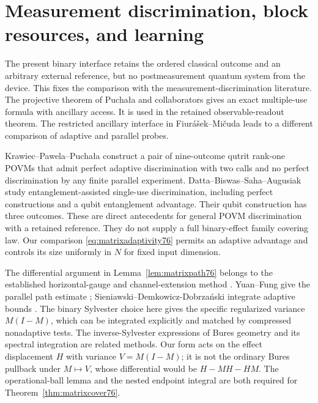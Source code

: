 \section{Measurement discrimination, block resources, and learning}
\label{sec:matrixcomparison76}
\label{sec:blockcomparison78}
\label{sec:confidencecomparison80}
The present binary interface retains the ordered classical outcome
and an arbitrary external reference, but no postmeasurement quantum
system from the device. This fixes the comparison with the
measurement-discrimination literature. The projective theorem of
Pucha\l a and collaborators \cite[Corollary~1 and Theorem~2]{PPKKO72}
gives an exact multiple-use formula with ancillary access. It is
used in the retained observable-readout theorem. The restricted
ancillary interface in Fiur\'a\v sek--Mi\v cuda \cite{FM75} leads
to a different comparison of adaptive and parallel probes.

Krawiec--Pawela--Pucha\l a \cite[Section~4]{KPP76} construct a pair
of nine-outcome qutrit rank-one POVMs that admit perfect adaptive
discrimination with two calls and no perfect discrimination by
any finite parallel experiment. Datta--Biswas--Saha--Augusiak
\cite[Theorems~3--5]{DBSA76} study entanglement-assisted
single-use discrimination, including perfect constructions and a
qubit entanglement advantage. Their qubit construction has three
outcomes. These are direct antecedents for general POVM
discrimination with a retained reference. They do not supply a
full binary-effect family covering law. Our comparison
\eqref{eq:matrixadaptivity76} permits an adaptive advantage and
controls its size uniformly in $N$ for fixed input dimension.

The differential argument in Lemma~\ref{lem:matrixpath76} belongs
to the established horizontal-gauge and channel-extension method
\cite{FI76,DKG67,DM76,KGAD76}. Yuan--Fung give the parallel path estimate
\cite[Section~III, equation~(26), PDF version~3]{YF76};
Sieniawski--Demkowicz-Dobrza\'nski integrate adaptive bounds
\cite[Section~IV.A]{SD76}. The binary Sylvester choice here gives the
specific regularized variance $M(I-M)$, which can be integrated
explicitly and matched by compressed nonadaptive tests. The
inverse-Sylvester expressions of Bures geometry
\cite{Dittmann76} and its spectral integration
\cite{SZGeom76} are related methods. Our form acts on the effect
displacement $H$ with variance $V=M(I-M)$; it is not the ordinary
Bures pullback under $M\mapsto V$, whose differential would be
$H-MH-HM$. The operational-ball lemma and the nested endpoint
integral are both required for Theorem~\ref{thm:matrixcover76}.

